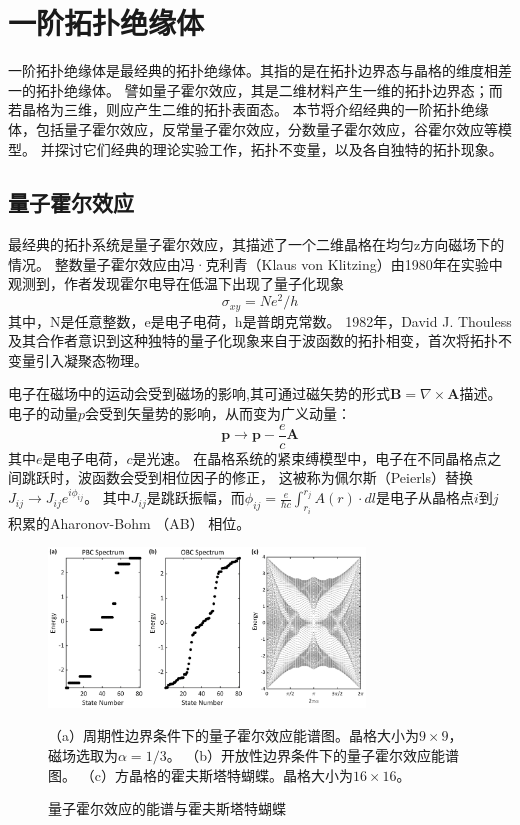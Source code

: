 \section{一阶拓扑绝缘体}
一阶拓扑绝缘体是最经典的拓扑绝缘体。其指的是在拓扑边界态与晶格的维度相差一的拓扑绝缘体。
譬如量子霍尔效应，其是二维材料产生一维的拓扑边界态；而若晶格为三维，则应产生二维的拓扑表面态。
本节将介绍经典的一阶拓扑绝缘体，包括量子霍尔效应，反常量子霍尔效应，分数量子霍尔效应，谷霍尔效应等模型。
并探讨它们经典的理论实验工作，拓扑不变量，以及各自独特的拓扑现象。

\subsection{量子霍尔效应}
最经典的拓扑系统是量子霍尔效应，其描述了一个二维晶格在均匀z方向磁场下的情况。
整数量子霍尔效应由冯·克利青（Klaus von Klitzing）由1980年在实验中观测到\cite{klitzing1980new}，作者发现霍尔电导在低温下出现了量子化现象
\begin{equation}
	\sigma_{xy}=Ne^2/h
\end{equation}
其中，N是任意整数，e是电子电荷，h是普朗克常数。
1982年，David J. Thouless及其合作者意识到这种独特的量子化现象来自于波函数的拓扑相变\cite{thouless1982quantized}，首次将拓扑不变量引入凝聚态物理。

电子在磁场中的运动会受到磁场的影响,其可通过磁矢势的形式$\mathbf{B}=\nabla\times \mathbf{A}$描述。
电子的动量$p$会受到矢量势的影响，从而变为广义动量：
\begin{equation}
	\mathbf{p}\to \mathbf{p}-\frac{e}{c}\mathbf{A}
\end{equation}
其中$e$是电子电荷，$c$是光速。
在晶格系统的紧束缚模型中，电子在不同晶格点之间跳跃时，波函数会受到相位因子的修正，
这被称为佩尔斯（Peierls）替换$J_{ij}\to J_{ij}e^{i\phi_{ij}}$。
其中$J_{ij}$是跳跃振幅，而$\phi_{ij}=\frac{e}{\hbar c}\int_{r_i}^{r_j} A(r) \cdot dl$是电子从晶格点$i$到$j$积累的Aharonov-Bohm （AB） 相位。

\begin{figure}[htbp]
	\centering
	\includegraphics[width=0.75\textwidth]{figure/Introduction/Hofstadter.png}
 \caption{量子霍尔效应的能谱与霍夫斯塔特蝴蝶}
（a）周期性边界条件下的量子霍尔效应能谱图。晶格大小为$9\times9$，磁场选取为$\alpha=1/3$。
（b）开放性边界条件下的量子霍尔效应能谱图。
（c）方晶格的霍夫斯塔特蝴蝶。晶格大小为$16\times16$。
 \label{fig:Hofstadter}
\end{figure}

